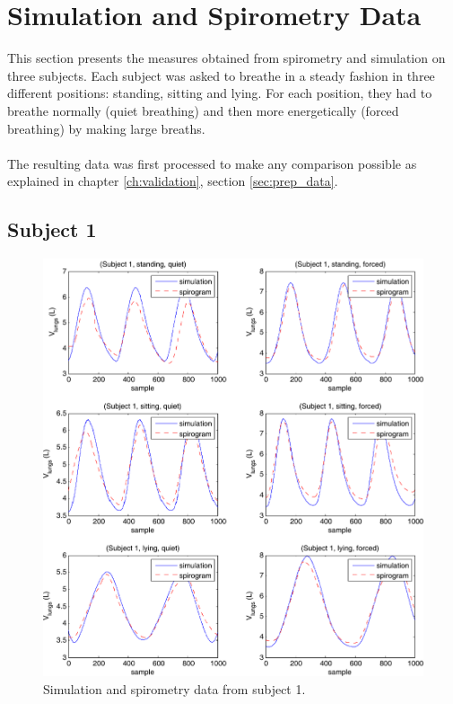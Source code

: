 
\chapter{\label{appendixA}Simulation and Spirometry Data}

This section presents the measures obtained from spirometry and simulation on three subjects. Each subject was asked to breathe in a steady fashion in three different positions: standing, sitting and lying. For each position, they had to breathe normally (quiet breathing) and then more energetically (forced breathing) by making large breaths. 
\\
\\
The resulting data was first processed to make any comparison possible as explained in chapter \ref{ch:validation}, section \ref{sec:prep_data}.

\newpage
\section{\label{appendixA:p1}Subject 1}

\begin{figure}[H]
	\centering
	 \includegraphics[width=1\textwidth]{pics/th}
	\caption[Simulation and spirometry data from subject 1]{\label{appA:fig:p1}Simulation and spirometry data from subject 1.}
\end{figure}

